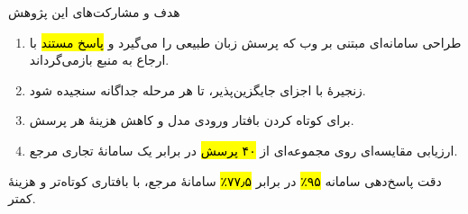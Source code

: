 \begin{frame}{هدف و مشارکت‌های این پژوهش}
  \begin{enumerate}
    \item طراحی سامانه‌ای مبتنی بر وب که پرسش زبان طبیعی را می‌گیرد و
          \hl{پاسخ مستند} با ارجاع به منبع بازمی‌گرداند.
    \item زنجیرهٔ  با اجزای جایگزین‌پذیر، تا
          هر مرحله جداگانه سنجیده شود.
    \item {} برای کوتاه کردن بافتار ورودی مدل و کاهش
          هزینهٔ هر پرسش.
    \item ارزیابی مقایسه‌ای روی مجموعه‌ای از \hl{۴۰ پرسش} در برابر یک سامانهٔ
          تجاری مرجع.
  \end{enumerate}

  \begin{PTresult}
    دقت پاسخ‌دهی سامانه \hl{۹۵٪} در برابر \hl{۷۷٫۵٪} سامانهٔ مرجع، با بافتاری
    کوتاه‌تر و هزینهٔ کمتر.
  \end{PTresult}
\end{frame}
